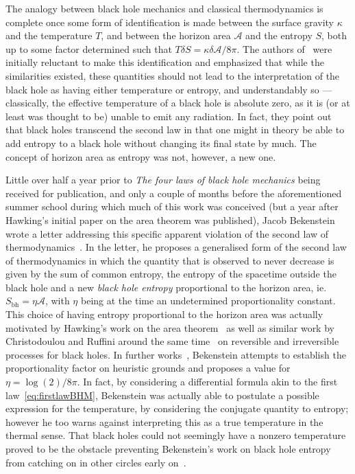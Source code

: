 \documentclass[
twoside,
openright,
frontopenright,
]{dmathesis}
\begin{document}
The analogy between black hole mechanics and classical thermodynamics is
complete once some form of identification is made between the surface gravity
$\kappa$ and the temperature $T$, and between the horizon area $\mathcal{A}$ and
the entropy $S$, both up to some factor determined such that
$T\delta S = \kappa \delta \mathcal{A} / 8\pi$. The authors
of~\cite{Bardeen:1973gs} were initially reluctant to make this identification
and emphasized that while the similarities existed, these quantities should not
lead to the interpretation of the black hole as having either temperature or
entropy, and understandably so --- classically, the effective temperature of a
black hole is absolute zero, as it is (or at least was thought to be) unable to
emit any radiation. In fact, they point out that black holes transcend the
second law in that one might in theory be able to add entropy to a black hole
without changing its final state by much. The concept of horizon area as entropy
was not, however, a new one.

Little over half a year prior to \emph{The four laws of black hole mechanics}
being received for publication, and only a couple of months before the
aforementioned summer school during which much of this work was conceived (but a
year after Hawking's initial paper on the area theorem was published), Jacob
Bekenstein wrote a letter addressing this specific apparent violation of the
second law of thermodynamics~\cite{Bekenstein:1972tm}. In the letter, he
proposes a generalised form of the second law of thermodynamics in which the
quantity that is observed to never decrease is given by the sum of common
entropy, the entropy of the spacetime outside the black hole and a new
\emph{black hole entropy} proportional to the horizon area, ie.
$S_{\mathrm{bh}}=\eta \mathcal{A}$, with $\eta$ being at the time an
undetermined proportionality constant. This choice of having entropy
proportional to the horizon area was actually motivated by Hawking's work on the
area theorem~\cite{Hawking:1971tu} as well as similar work by Christodoulou and
Ruffini around the same time~\cite{Christodoulou:1970wf,Christodoulou:1972kt} on
reversible and irreversible processes for black holes. In further
works~\cite{Bekenstein:1973ur,Bekenstein:1974ax}, Bekenstein attempts to
establish the proportionality factor on heuristic grounds and proposes a value
for $\eta=\log(2)/8\pi$. In fact, by considering a differential formula akin to
the first law~\eqref{eq:firstlawBHM}, Bekenstein was actually able to postulate
a possible expression for the temperature, by considering the conjugate quantity
to entropy; however he too warns against interpreting this as a true temperature
in the thermal sense. That black holes could not seemingly have a nonzero
temperature proved to be the obstacle preventing Bekenstein's work on black hole
entropy from catching on in other circles early on~\cite{10.2307/24953849}.
\end{document}
